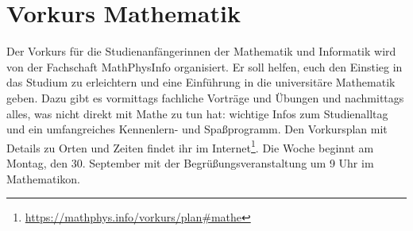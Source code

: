 \section{Vorkurs Mathematik}
Der Vorkurs für die Studienanfängerinnen der Mathematik und Informatik wird von der Fachschaft MathPhysInfo organisiert. Er soll helfen, euch den Einstieg in das Studium zu erleichtern und eine Einführung in die universitäre Mathematik geben. Dazu gibt es vormittags fachliche Vorträge und Übungen und nachmittags alles, was nicht direkt mit Mathe zu tun hat: wichtige Infos zum Studienalltag und ein umfangreiches Kennenlern- und Spaßprogramm. Den Vorkursplan mit Details zu Orten und Zeiten findet ihr im Internet\footnote{\label{mathe-vorkursplan}\url{https://mathphys.info/vorkurs/plan\#mathe}}. Die Woche beginnt am Montag, den 30. September mit der Begrüßungsveranstaltung um 9 Uhr im \gls{Mathematikon}.
